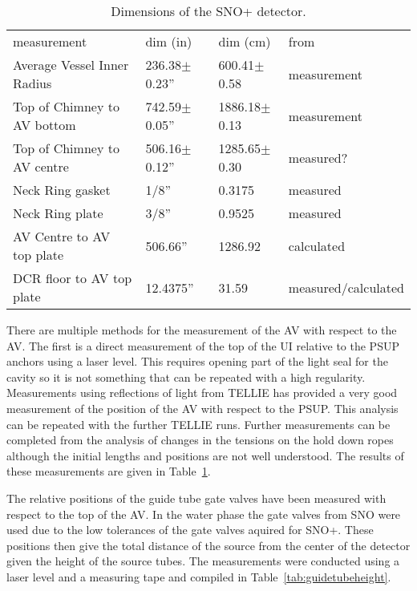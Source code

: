 \begin{table}
  \begin{center}
    \begin{tabular}{llll}
      \hline
      measurement & dim (in)& dim (cm)& from \\
      Average Vessel Inner Radius & 236.38$\pm$0.23'' &
      600.41$\pm$0.58 & measurement\\ 
      Top of Chimney to AV bottom & 742.59$\pm$0.05'' &
      1886.18$\pm$0.13 & measurement\\ 
      Top of Chimney to AV centre & 506.16$\pm$0.12'' & 1285.65$\pm$0.30 &
      measured? \\
      Neck Ring gasket & 1/8'' & 0.3175 & measured \\
      Neck Ring plate & 3/8'' & 0.9525 & measured \\
      AV Centre to AV top plate & 506.66'' & 1286.92 & calculated \\
      DCR floor to AV top plate & 12.4375'' & 31.59 & measured/calculated\\
      \hline
    \end{tabular}
  \end{center}
  \caption{Dimensions of the SNO+ detector.}
  \label{tab:avpsupmeas}
\end{table}



There are multiple methods for the measurement of the AV with respect
to the AV. The first is a direct measurement of the top of the UI
relative to the PSUP anchors using a laser level. This requires
opening part of the light seal for the cavity so it is not something
that can be repeated with a high regularity. Measurements using
reflections of light from TELLIE has provided a very good measurement
of the position of the AV with respect to the PSUP. This analysis can
be repeated with the further TELLIE runs. Further measurements can be
completed from the analysis of changes in the tensions on the hold
down ropes although the initial lengths and positions are not well
understood. The results of these measurements are given in
Table~\ref{tab:avpsupmeas}.

The relative positions of the guide tube gate valves have been
measured with respect to the top of the AV. In the water phase the
gate valves from SNO were used due to the low tolerances of the gate
valves aquired for SNO+. These positions then give the total distance
of the source from the center of the detector given the height of the
source tubes. The measurements were conducted using a laser level and
a measuring tape and compiled in Table~\ref{tab:guidetubeheight}.

